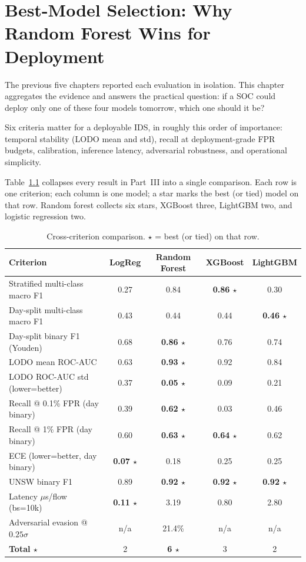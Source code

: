 \chapter{Best-Model Selection: Why Random Forest Wins for Deployment}
\label{ch:bestmodel}

The previous five chapters reported each evaluation in isolation. This
chapter aggregates the evidence and answers the practical question: if a
SOC could deploy only one of these four models tomorrow, which one
should it be?

Six criteria matter for a deployable IDS, in roughly this order of
importance: temporal stability (LODO mean and std), recall at
deployment-grade FPR budgets, calibration, inference latency,
adversarial robustness, and operational simplicity.

Table~\ref{tab:best-model} collapses every result in Part~III into a
single comparison. Each row is one criterion; each column is one model;
a star marks the best (or tied) model on that row. Random forest collects
six stars, XGBoost three, LightGBM two, and logistic regression two.

\begin{table}[H]
    \centering
    \caption{Cross-criterion comparison. $\star$ = best (or tied) on that row.}
    \label{tab:best-model}
    \footnotesize
    \begin{tabular}{lcccc}
        \toprule
        \textbf{Criterion} & \textbf{LogReg} & \textbf{Random Forest} & \textbf{XGBoost} & \textbf{LightGBM} \\
        \midrule
        Stratified multi-class macro F1 & 0.27 & 0.84 & \textbf{0.86 $\star$} & 0.30 \\
        Day-split multi-class macro F1 & 0.43 & 0.44 & 0.44 & \textbf{0.46 $\star$} \\
        Day-split binary F1 (Youden) & 0.68 & \textbf{0.86 $\star$} & 0.76 & 0.74 \\
        LODO mean ROC-AUC & 0.63 & \textbf{0.93 $\star$} & 0.92 & 0.84 \\
        LODO ROC-AUC std (lower=better) & 0.37 & \textbf{0.05 $\star$} & 0.09 & 0.21 \\
        Recall @ 0.1\% FPR (day binary) & 0.39 & \textbf{0.62 $\star$} & 0.03 & 0.46 \\
        Recall @ 1\% FPR (day binary) & 0.60 & \textbf{0.63 $\star$} & \textbf{0.64 $\star$} & 0.62 \\
        ECE (lower=better, day binary) & \textbf{0.07 $\star$} & 0.18 & 0.25 & 0.25 \\
        UNSW binary F1 & 0.89 & \textbf{0.92 $\star$} & \textbf{0.92 $\star$} & \textbf{0.92 $\star$} \\
        Latency $\mu$s/flow (bs=10k) & \textbf{0.11 $\star$} & 3.19 & 0.80 & 2.80 \\
        Adversarial evasion @ $0.25\sigma$ & n/a & 21.4\% & n/a & n/a \\
        \midrule
        \textbf{Total $\star$} & 2 & \textbf{6 $\star$} & 3 & 2 \\
        \bottomrule
    \end{tabular}
\end{table}


